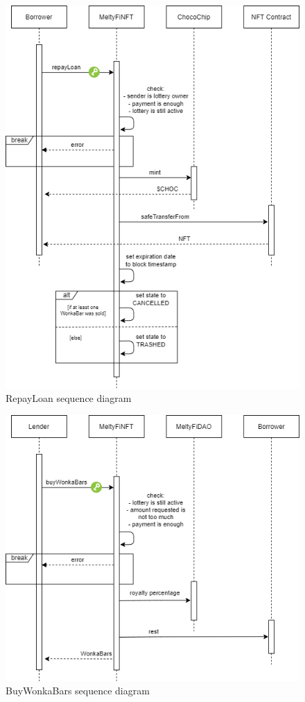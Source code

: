 \begin{figure}[h]
    \centering
    \includegraphics[width=\textwidth]{figures/RepayLoan.png}
    \caption{RepayLoan sequence diagram}
    \label{fig:RepayLoan}
\end{figure}

\begin{figure}[h]
    \centering
    \includegraphics[width=\textwidth]{figures/BuyWonkaBars.png}
    \caption{BuyWonkaBars sequence diagram}
    \label{fig:BuyWonkaBars}
\end{figure}

